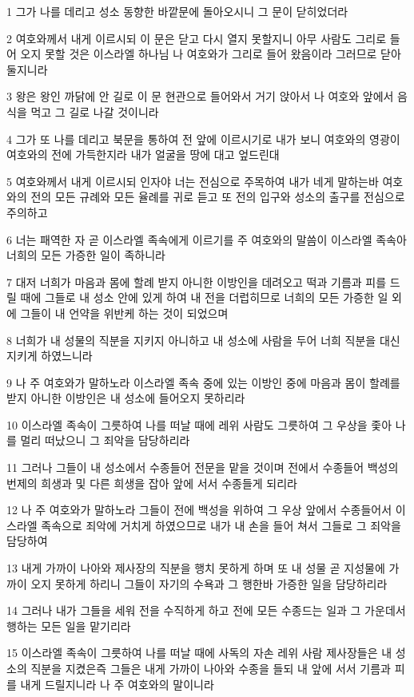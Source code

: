 \par 1 그가 나를 데리고 성소 동향한 바깥문에 돌아오시니 그 문이 닫히었더라
\par 2 여호와께서 내게 이르시되 이 문은 닫고 다시 열지 못할지니 아무 사람도 그리로 들어 오지 못할 것은 이스라엘 하나님 나 여호와가 그리로 들어 왔음이라 그러므로 닫아 둘지니라
\par 3 왕은 왕인 까닭에 안 길로 이 문 현관으로 들어와서 거기 앉아서 나 여호와 앞에서 음식을 먹고 그 길로 나갈 것이니라
\par 4 그가 또 나를 데리고 북문을 통하여 전 앞에 이르시기로 내가 보니 여호와의 영광이 여호와의 전에 가득한지라 내가 얼굴을 땅에 대고 엎드린대
\par 5 여호와께서 내게 이르시되 인자야 너는 전심으로 주목하여 내가 네게 말하는바 여호와의 전의 모든 규례와 모든 율례를 귀로 듣고 또 전의 입구와 성소의 출구를 전심으로 주의하고
\par 6 너는 패역한 자 곧 이스라엘 족속에게 이르기를 주 여호와의 말씀이 이스라엘 족속아 너희의 모든 가증한 일이 족하니라
\par 7 대저 너희가 마음과 몸에 할례 받지 아니한 이방인을 데려오고 떡과 기름과 피를 드릴 때에 그들로 내 성소 안에 있게 하여 내 전을 더럽히므로 너희의 모든 가증한 일 외에 그들이 내 언약을 위반케 하는 것이 되었으며
\par 8 너희가 내 성물의 직분을 지키지 아니하고 내 성소에 사람을 두어 너희 직분을 대신 지키게 하였느니라
\par 9 나 주 여호와가 말하노라 이스라엘 족속 중에 있는 이방인 중에 마음과 몸이 할례를 받지 아니한 이방인은 내 성소에 들어오지 못하리라
\par 10 이스라엘 족속이 그릇하여 나를 떠날 때에 레위 사람도 그릇하여 그 우상을 좇아 나를 멀리 떠났으니 그 죄악을 담당하리라
\par 11 그러나 그들이 내 성소에서 수종들어 전문을 맡을 것이며 전에서 수종들어 백성의 번제의 희생과 및 다른 희생을 잡아 앞에 서서 수종들게 되리라
\par 12 나 주 여호와가 말하노라 그들이 전에 백성을 위하여 그 우상 앞에서 수종들어서 이스라엘 족속으로 죄악에 거치게 하였으므로 내가 내 손을 들어 쳐서 그들로 그 죄악을 담당하여
\par 13 내게 가까이 나아와 제사장의 직분을 행치 못하게 하며 또 내 성물 곧 지성물에 가까이 오지 못하게 하리니 그들이 자기의 수욕과 그 행한바 가증한 일을 담당하리라
\par 14 그러나 내가 그들을 세워 전을 수직하게 하고 전에 모든 수종드는 일과 그 가운데서 행하는 모든 일을 맡기리라
\par 15 이스라엘 족속이 그릇하여 나를 떠날 때에 사독의 자손 레위 사람 제사장들은 내 성소의 직분을 지켰은즉 그들은 내게 가까이 나아와 수종을 들되 내 앞에 서서 기름과 피를 내게 드릴지니라 나 주 여호와의 말이니라
